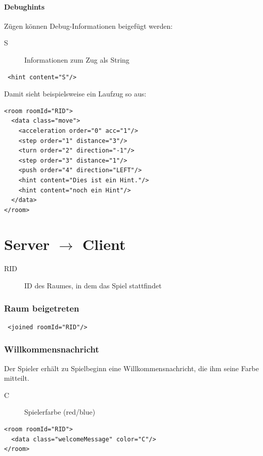 \documentclass[12pt,a4paper, ngerman, oneside]{scrartcl}
\begin{document}
\subsection{Debughints}
Zügen können Debug-Informationen beigefügt werden:
\begin{description}
\item[S] Informationen zum Zug als String
\end{description}
\begin{verbatim}
 <hint content="S"/>
\end{verbatim}
Damit sieht beispielsweise ein Laufzug so aus:
\begin{verbatim}
<room roomId="RID">
  <data class="move">
    <acceleration order="0" acc="1"/>
    <step order="1" distance="3"/>
    <turn order="2" direction="-1"/>
    <step order="3" distance="1"/>
    <push order="4" direction="LEFT"/>
    <hint content="Dies ist ein Hint."/>
    <hint content="noch ein Hint"/>
  </data>
</room>
\end{verbatim}



\newpage
\part{Server $\rightarrow$ Client}
\begin{description}
\item[RID] ID des Raumes, in dem das Spiel stattfindet
\end{description}

\section{Raum beigetreten}
 \begin{verbatim}
 <joined roomId="RID"/>
 \end{verbatim}

\section{Willkommensnachricht}
Der Spieler erhält zu Spielbeginn eine Willkommensnachricht, die ihm seine Farbe mitteilt.
\begin{description}
\item[C] Spielerfarbe (red/blue)
\end{description}
\begin{verbatim}
<room roomId="RID">
  <data class="welcomeMessage" color="C"/>
</room>
\end{verbatim}
\end{document}
